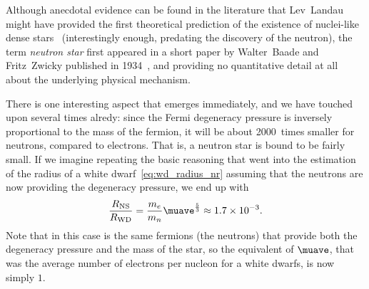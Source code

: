Although anecdotal evidence can be found in the literature that Lev~Landau
might have provided the first theoretical prediction of the existence of
nuclei-like dense stars~\cite{1932PhyZS...1..285L} (interestingly enough, predating
the discovery of the neutron), the term \emph{neutron star}%
first appeared in a short paper by Walter~Baade and Fritz~Zwicky published in
1934~\cite{1934PNAS...20..259B}, and providing no quantitative detail at all about
the underlying physical mechanism.


There is one interesting aspect that emerges immediately, and we have touched upon
several times alredy: since the Fermi degeneracy pressure is inversely proportional
to the mass of the fermion, it will be about 2000~times smaller for neutrons,
compared to electrons. That is, a neutron star is bound to be fairly small. If we
imagine repeating the basic reasoning that went into the estimation of the radius
of a white dwarf~\eqref{eq:wd_radius_nr} assuming
that the neutrons are now providing the degeneracy pressure, we end up with
\begin{align}
  \frac{R_\text{NS}}{R_\text{WD}} = \frac{m_e}{m_n} \muave^\frac{5}{3}
  \approx 1.7 \times 10^{-3}.
\end{align}
Note that in this case is the same fermions (the neutrons) that provide both the
degeneracy pressure and the mass of the star, so the equivalent of $\muave$, that
was the average number of electrons per nucleon for a white dwarfs, is now simply $1$.

